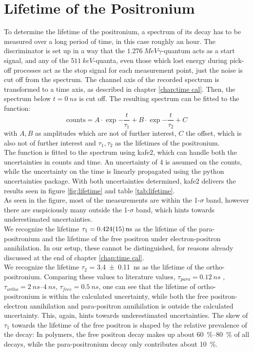 \section{Lifetime of the Positronium}

To determine the lifetime of the positronium, a spectrum of its decay has to be measured over a long period of time, in this case roughly an hour. The discriminator is set up in a way that the $\SI{1.276}{MeV} \gamma$-quantum acts as a start signal, and any of the $\SI{511}{keV}$-quanta, even those which lost energy during pick-off processes act as the stop signal for each measurement point, just the noise is cut off from the spectrum. 
The channel axis of the recorded spectrum is transformed to a time axis, as described in chapter \ref{chap:time cal}. Then, the spectrum below $t = \SI{0}{ns}$ is cut off. The resulting spectrum can be fitted to the function: 
$$\mathrm{counts} = A\cdot\exp{-\frac{t}{\tau_1}}+ B\cdot\exp{-\frac{t}{\tau_2}} + C $$
with $A,B$ as amplitudes which are not of further interest, $C$ the offset, which is also not of further interest and $\tau_1, \tau_2$ as the lifetimes of the positronium.\\
The function is fitted to the spectrum using kafe2, which can handle both the uncertainties in counts and time. An uncertainty of 4 is assumed on the counts, while the uncertainty on the time is linearly propagated using the python uncertainties package. With both uncertainties determined, kafe2 delivers the results seen in figure \ref{fig:lifetime} and table \ref{tab:lifetime}.\\ As seen in the figure, most of the measurements are within the 1-$\sigma$ band, however there are suspiciously many outside the 1-$\sigma$ band, which hints towards underestimated uncertainties.\\
We recognize the lifetime $\tau_1 = \SI{0.424 \pm 0.015}{ns}$ as the lifetime of the para-positronium and the lifetime of the free positron under electron-positron annihilation. In our setup, these cannot be distinguished, for reasons already discussed at the end of chapter \ref{chap:time cal}. \\We recognize the lifetime $\tau_2$ = \SI{3.4 \pm 0.11}{ns} as the lifetime of the ortho-positronium.
Comparing these values to literature values\cite{BlueBook}, $\tau_{para} = \SI{0.12}{ns}$ , $\tau_{ortho} = \SIrange[]{2}{4}{ns}$, $\tau_{free} = \SI{0.5}{ns}$, one can see that the lifetime of ortho-positronium is within the calculated uncertainty, while both the free positron-electron annihilation and para-positron annihilation is outside the calculated uncertainty. This, again, hints towards underestimated uncertainties. The skew of $\tau_1$ towards the lifetime of the free positron is shaped by the relative prevalence of the decay: In polymers, the free positron decay makes up about \SIrange{60}{80}{\%} of all decays, while the para-positronium decay only contributes about \SI{10}{\%}.



